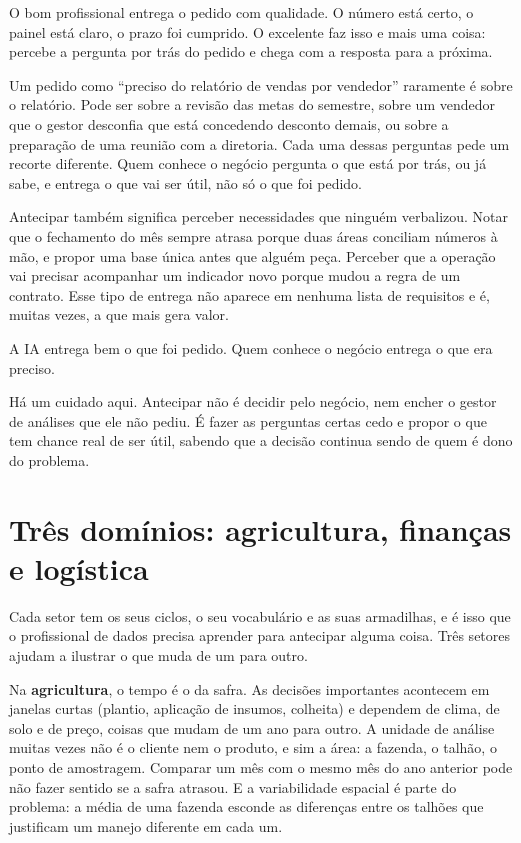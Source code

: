 O bom profissional entrega o pedido com qualidade. O número está certo, o painel está
claro, o prazo foi cumprido. O excelente faz isso e mais uma coisa: percebe a pergunta por
trás do pedido e chega com a resposta para a próxima.

Um pedido como \enquote{preciso do relatório de vendas por vendedor} raramente é sobre o
relatório. Pode ser sobre a revisão das metas do semestre, sobre um vendedor que o gestor
desconfia que está concedendo desconto demais, ou sobre a preparação de uma reunião com a
diretoria. Cada uma dessas perguntas pede um recorte diferente. Quem conhece o negócio
pergunta o que está por trás, ou já sabe, e entrega o que vai ser útil, não só o que foi
pedido.

Antecipar também significa perceber necessidades que ninguém verbalizou. Notar que o
fechamento do mês sempre atrasa porque duas áreas conciliam números à mão, e propor uma
base única antes que alguém peça. Perceber que a operação vai precisar acompanhar um
indicador novo porque mudou a regra de um contrato. Esse tipo de entrega não aparece em
nenhuma lista de requisitos e é, muitas vezes, a que mais gera valor.

\begin{destaque}
A IA entrega bem o que foi pedido. Quem conhece o negócio entrega o que era preciso.
\end{destaque}

Há um cuidado aqui. Antecipar não é decidir pelo negócio, nem encher o gestor de análises
que ele não pediu. É fazer as perguntas certas cedo e propor o que tem chance real de ser
útil, sabendo que a decisão continua sendo de quem é dono do problema.

\section{Três domínios: agricultura, finanças e logística}
\label{sec:tres-dominios}

Cada setor tem os seus ciclos, o seu vocabulário e as suas armadilhas, e é isso que o
profissional de dados precisa aprender para antecipar alguma coisa. Três setores ajudam a
ilustrar o que muda de um para outro.

Na \textbf{agricultura}, o tempo é o da safra. As decisões importantes acontecem em
janelas curtas (plantio, aplicação de insumos, colheita) e dependem de clima, de solo e de
preço, coisas que mudam de um ano para outro. A unidade de análise muitas vezes não é o
cliente nem o produto, e sim a área: a fazenda, o talhão, o ponto de amostragem. Comparar
um mês com o mesmo mês do ano anterior pode não fazer sentido se a safra atrasou. E a
variabilidade espacial é parte do problema: a média de uma fazenda esconde as diferenças
entre os talhões que justificam um manejo diferente em cada um.

